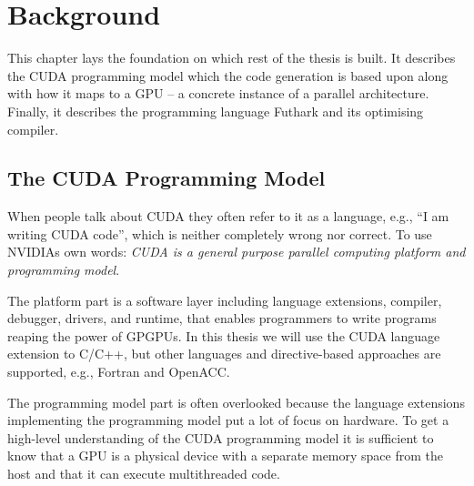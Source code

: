 \chapter{Background}
\label{chap:background}

This chapter lays the foundation on which rest of the thesis
is built. It describes the CUDA programming model which the
code generation is based upon along with how it maps to a
GPU -- a concrete instance of a parallel architecture.
Finally, it describes the programming language Futhark and
its optimising compiler.


\section{The CUDA Programming Model}
\label{sec:cuda}

When people talk about CUDA they often refer to it as a
language, e.g., ``I am writing CUDA code'', which is
neither completely wrong nor correct. To use NVIDIAs own
words: \emph{CUDA is a general purpose parallel computing
  platform and programming model}.

The platform part is a software layer including language
extensions, compiler, debugger, drivers, and runtime, that
enables programmers to write programs reaping the power of
GPGPUs. In this thesis we will use the CUDA language
extension to C/C++, but other languages and directive-based
approaches are supported, e.g., Fortran and OpenACC.

The programming model part is often overlooked because the
language extensions implementing the programming model put a
lot of focus on hardware. To get a high-level understanding
of the CUDA programming model it is sufficient to know that
a GPU is a physical device with a separate memory space from
the host and that it can execute multithreaded code.

